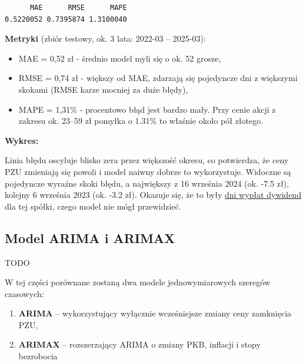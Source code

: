 \documentclass[
  polish,
  letterpaper,
  DIV=11,
  numbers=noendperiod]{scrartcl}
\providecommand{\tightlist}{%
  \setlength{\itemsep}{0pt}\setlength{\parskip}{0pt}}
\begin{document}
\begin{verbatim}
      MAE      RMSE      MAPE 
0.5220052 0.7395874 1.3100040 
\end{verbatim}

\textbf{Metryki} (zbiór testowy, ok. 3 lata: 2022-03 -- 2025-03):

\begin{itemize}
\tightlist
\item
  MAE = 0,52 zł - średnio model myli się o ok. 52 grosze,
\item
  RMSE = 0,74 zł - większy od MAE, zdarzają się pojedyncze dni z
  większymi skokami (RMSE karze mocniej za duże błędy),
\item
  MAPE = 1,31\% - procentowo błąd jest bardzo mały. Przy cenie akcji z
  zakresu ok. 23--59 zł pomyłka o 1.31\% to właśnie około pół złotego.
\end{itemize}

\textbf{Wykres:}

Linia błędu oscyluje blisko zera przez większość okresu, co potwierdza,
że ceny PZU zmieniają się powoli i model naiwny dobrze to wykorzystuje.
Widoczne są pojedyncze wyraźne skoki błędu, a największy z 16 września
2024 (ok. -7.5 zł), kolejny 6 września 2023 (ok. -3.2 zł). Okazuje się,
że to były
\href{https://strefainwestorow.pl/notowania/spolki/PLPZU0000011/dywidendy}{dni
wypłat dywidend} dla tej spółki, czego model nie mógł przewidzieć.

\subsection{Model ARIMA i ARIMAX}\label{model-arima-i-arimax}

TODO

W tej części porównane zostaną dwa modele jednowymiarowych szeregów
czasowych:

\begin{enumerate}
\def\labelenumi{\arabic{enumi}.}
\tightlist
\item
  \textbf{ARIMA} -- wykorzystujący wyłącznie wcześniejsze zmiany ceny
  zamknięcia PZU,
\item
  \textbf{ARIMAX} -- rozszerzający ARIMA o zmiany PKB, inflacji i stopy
  bezrobocia
\end{enumerate}
\end{document}
